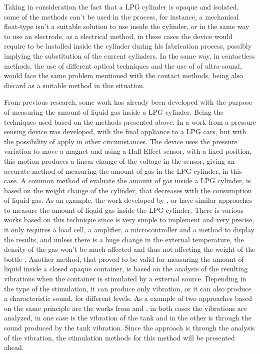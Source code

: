 Taking in consideration the fact that a LPG cylinder is opaque and isolated, some of the methods can't be used in the process, for instance, a mechanical float-type isn't a suitable solution to use inside the cylinder, or in the same way to use an electrode, as a electrical method, in these cases the device would require to be installed inside the cylinder during his fabrication process, possibly implying the substitution of the current cylinders. In the same way, in contactless methods, the use of different optical techniques and the use of of ultra-sound, would face the same problem mentioned with the contact methods, being also discard as a suitable method in this situation. 

From previous research, some work has already been developed with the purpose of measuring the amount of liquid gas inside a LPG cylinder. Being the techniques used based on the methods presented above.
In a work from \citeauthor{baigAccurateMeasurementPressure2008b} a pressure sensing device was developed, with the final appliance to a LPG cars, but with the possibility of apply in other circumstances. The device uses the pressure variation to move a magnet and using a Hall Effect sensor, with a fixed position, this motion produces a linear change of the voltage in the sensor, giving an accurate method of measuring the amount of gas in the LPG cylinder, in this case\cite{baigAccurateMeasurementPressure2008b}. 
A common method of evaluate the amount of gas inside a LPG cylinder, is based on the weight change of the cylinder, that decreases with the consumption of liquid gas. As an example, the work developed by \citeauthor{dasilvamedeirosSmartgasSmartPlatform2017a}, \citeauthor{shresthaIoTBasedSmart2019a} or \citeauthor{shinganSmartGasCylinder2017a} have similar approaches to measure the amount of liquid gas inside the LPG cylinder. There is various works based on this technique since is very simple to implement and very precise, it only requires a load cell, a amplifier, a microcontroller and a method to display the results, and unless there is a huge change in the external temperature, the density of the gas won't be much affected and thus not affecting the weight of the bottle \cite{dasilvamedeirosSmartgasSmartPlatform2017a}\cite{shresthaIoTBasedSmart2019a}\cite{shinganSmartGasCylinder2017a}.
Another method, that proved to be valid for measuring the amount of liquid inside a closed opaque container, is based on the analysis of the resulting vibrations when the container is stimulated by a external source. Depending in the type of the stimulation, it can produce only vibration, or it can also produce a characteristic sound, for different levels. As a example of two approaches based on the same principle are the works from \citeauthor{jahnLevelSensorFluids2014a} and \citeauthor{wuAnalysisImplementationNoncontact2016a}, in both cases the vibrations are analyzed, in one case is the vibration of the tank and in the other is through the sound produced by the tank vibration\cite{jahnLevelSensorFluids2014a}\cite{wuAnalysisImplementationNoncontact2016a}. Since the approach is through the analysis of the vibration, the stimulation methods for this method will be presented ahead. 

